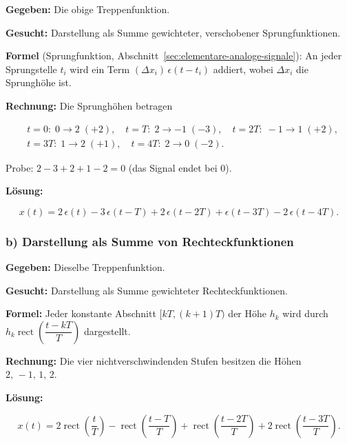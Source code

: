 \begin{beispiel}

\textbf{Gegeben:} Die obige Treppenfunktion.

\textbf{Gesucht:} Darstellung als Summe gewichteter, verschobener
Sprungfunktionen.

\textbf{Formel} (Sprungfunktion, Abschnitt~\ref{sec:elementare-analoge-signale}):
An jeder Sprungstelle $t_i$ wird ein Term $(\Delta x_i)\,\epsilon(t - t_i)$
addiert, wobei $\Delta x_i$ die Sprunghöhe ist.

\textbf{Rechnung:} Die Sprunghöhen betragen

$$
\begin{aligned}
&t=0:\; 0 \to 2 \;(+2), \quad
 t=T:\; 2 \to -1 \;(-3), \quad
 t=2T:\; -1 \to 1 \;(+2), \\
&t=3T:\; 1 \to 2 \;(+1), \quad
 t=4T:\; 2 \to 0 \;(-2).
\end{aligned}
$$

Probe: $2 - 3 + 2 + 1 - 2 = 0$ \checkmark (das Signal endet bei $0$).

\textbf{Lösung:}

$$
\boxed{\;x(t) = 2\,\epsilon(t) - 3\,\epsilon(t-T) + 2\,\epsilon(t-2T)
+ \epsilon(t-3T) - 2\,\epsilon(t-4T).\;}
$$

\end{beispiel}

\subsubsection*{b) Darstellung als Summe von Rechteckfunktionen}

\begin{beispiel}

\textbf{Gegeben:} Dieselbe Treppenfunktion.

\textbf{Gesucht:} Darstellung als Summe gewichteter Rechteckfunktionen.

\textbf{Formel:} Jeder konstante Abschnitt $[kT,(k+1)T)$ der Höhe $h_k$ wird
durch $h_k \operatorname{rect}\!\left(\dfrac{t-kT}{T}\right)$ dargestellt.

\textbf{Rechnung:} Die vier nichtverschwindenden Stufen besitzen die Höhen
$2,\, -1,\, 1,\, 2$.

\textbf{Lösung:}

$$
\boxed{\;x(t) = 2\operatorname{rect}\!\left(\frac{t}{T}\right)
- \operatorname{rect}\!\left(\frac{t-T}{T}\right)
+ \operatorname{rect}\!\left(\frac{t-2T}{T}\right)
+ 2\operatorname{rect}\!\left(\frac{t-3T}{T}\right).\;}
$$

\end{beispiel}


